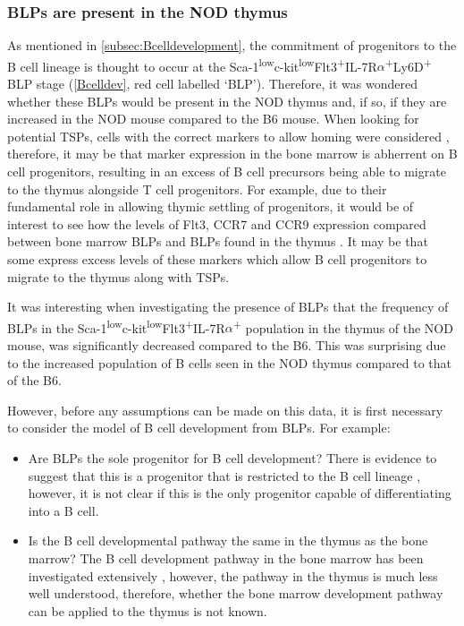 \subsubsection{BLPs are present in the NOD thymus}

As mentioned in \cref{subsec:Bcelldevelopment}, the commitment of progenitors to the B cell lineage is thought to occur at the Sca-1\textsuperscript{low}c-kit\textsuperscript{low}Flt3\textsuperscript{+}IL-7R$\alpha$\textsuperscript{+}Ly6D\textsuperscript{+} BLP stage (\cref{Bcelldev}, red cell labelled `BLP').
Therefore, it was wondered whether these BLPs would be present in the NOD thymus and, if so, if they are increased in the NOD mouse compared to the B6 mouse.
When looking for potential TSPs, cells with the correct markers to allow homing were considered \citep{Zlotoff2011}, therefore, it may be that marker expression in the bone marrow is abherrent on B cell progenitors, resulting in an excess of B cell precursors being able to migrate to the thymus alongside T cell progenitors.
For example, due to their fundamental role in allowing thymic settling of progenitors, it would be of interest to see how the levels of Flt3, CCR7 and CCR9 expression compared between bone marrow BLPs and BLPs found in the thymus \citep{Zlotoff2011, Zlotoff2010}.
It may be that some express excess levels of these markers which allow B cell progenitors to migrate to the thymus along with TSPs.

It was interesting when investigating the presence of BLPs that the frequency of BLPs in the Sca-1\textsuperscript{low}c-kit\textsuperscript{low}Flt3\textsuperscript{+}IL-7R$\alpha$\textsuperscript{+} population in the thymus of the NOD mouse, was significantly decreased compared to the B6.
This was surprising due to the increased population of B cells seen in the NOD thymus compared to that of the B6.

However, before any assumptions can be made on this data, it is first necessary to consider the model of B cell development from BLPs.
For example:
\begin{itemize}
\item Are BLPs the sole progenitor for B cell development? There is evidence to suggest that this is a progenitor that is restricted to the B cell lineage \citep{Inlay2009}, however, it is not clear if this is the only progenitor capable of differentiating into a B cell.
\item Is the B cell developmental pathway the same in the thymus as the bone marrow? The B cell development pathway in the bone marrow has been investigated extensively \citep{Welinder2011}, however, the pathway in the thymus is much less well understood, therefore, whether the bone marrow development pathway can be applied to the thymus is not known. 
\end{itemize}


